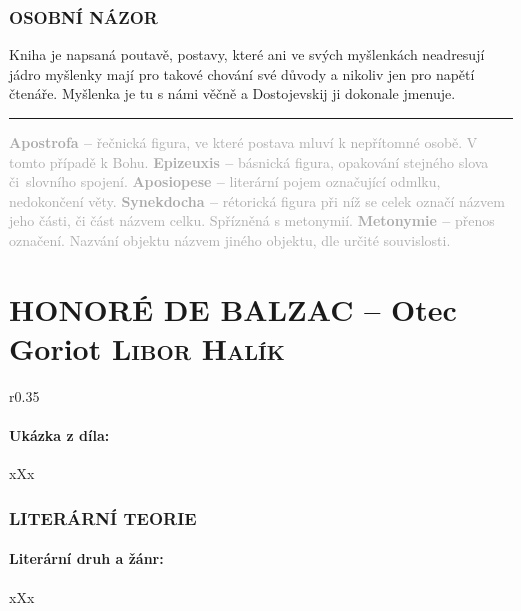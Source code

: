 \documentclass[A4paper]{extarticle} %
\begin{document}
\section*{OSOBNÍ NÁZOR}
\noindent 
Kniha je napsaná poutavě, postavy, které ani ve svých myšlenkách neadresují jádro myšlenky mají pro  takové chování své důvody a nikoliv jen pro napětí čtenáře. Myšlenka je tu s námi věčně a Dostojevskij ji dokonale jmenuje.

\vfill

\noindent\begin{minipage}{\textwidth}
    \textcolor{darkgray}{\rule{\linewidth}{0.4pt}
    \footnotesize
    \textbf{Apostrofa --} řečnická figura, ve které postava mluví k nepřítomné osobě. V tomto případě k Bohu.
    \textbf{Epizeuxis --} básnická figura, opakování stejného slova či~slovního spojení. 
    \textbf{Aposiopese --} literární pojem označující odmlku, nedokončení věty.
    \textbf{Synekdocha --} rétorická figura při níž se celek označí názvem jeho části, či část názvem celku. Spřízněná s metonymií.
    \textbf{Metonymie --} přenos označení. Nazvání objektu názvem jiného objektu, dle určité souvislosti.
    }
\end{minipage}

\newpage


\changefontsize{8pt}

\part*{HONORÉ DE BALZAC -- Otec Goriot {\hfill \normalfont\tiny\textsc{Libor Halík}}}

\noindent\begin{wrapfigure}{r}{0.35\textwidth}
\tiny

\subsection*{Ukázka z díla:}
\setlength{\parindent}{3pt}
xXx
\end{wrapfigure}

\section*{LITERÁRNÍ TEORIE}

\subsection*{Literární druh a žánr:}
\noindent xXx
\end{document}
